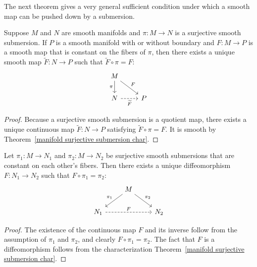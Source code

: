 The next theorem gives a very general sufficient condition under which a smooth map can be pushed down by a submersion.
\begin{theorem}\label{pass to quotient}
Suppose $M$ and $N$ are smooth manifolds and $\pi:M\to N$ is a surjective smooth submersion. If $P$ is a smooth manifold with or without boundary and $F:M\to P$ is a smooth map that is constant on the fibers of $\pi$, then there exists a unique smooth map $\widetilde{F}:N\to P$ such that $\widetilde{F}\circ\pi=F$:
\[\begin{tikzcd}
M\ar[d,swap,"\pi"]\ar[rd,"F"]&\\
N\ar[r,swap,dashed,"\widetilde{F}"]&P
\end{tikzcd}\]
\end{theorem}
\begin{proof}
Because a surjective smooth submersion is a quotient map, there exists a unique continuous map $\widetilde{F}:N\to P$ satisfying $\widetilde{F}\circ\pi=F$. It is smooth by Theorem~\ref{manifold surjective submersion char}.
\end{proof}
\begin{theorem}\label{smooth quotient unique}
Let $\pi_1:M\to N_1$ and $\pi_2:M\to N_2$ be surjective smooth submersions that are constant on each other's fibers. Then there exists a unique diffeomorphism $F:N_1\to N_2$ such that $F\circ\pi_1=\pi_2$:
\[\begin{tikzcd}
&M\ar[ld,swap,"\pi_1"]\ar[rd,"\pi_2"]&\\
N_1\ar[rr,dashed,"F"]&&N_2
\end{tikzcd}\]
\end{theorem}
\begin{proof}
The existence of the continuous map $F$ and its inverse follow from the assumption of $\pi_1$ and $\pi_2$, and clearly $F\circ\pi_1=\pi_2$. The fact that $F$ is a diffeomorphism follows from the characterization Theorem~\ref{manifold surjective submersion char}.
\end{proof}
